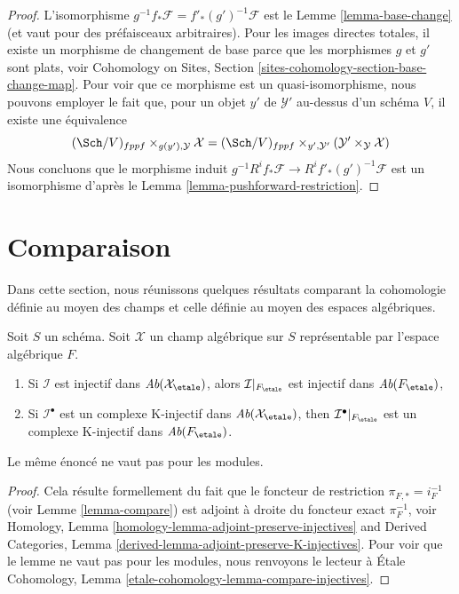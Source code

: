 \begin{proof}
L'isomorphisme $g^{-1}f_*\mathcal{F} = f'_*(g')^{-1}\mathcal{F}$ est le
Lemme \ref{lemma-base-change} (et vaut pour des préfaisceaux arbitraires).
Pour les images directes totales, il existe un morphisme de changement de base parce que les
morphismes $g$ et $g'$ sont plats, voir
Cohomology on Sites, Section \ref{sites-cohomology-section-base-change-map}.
Pour voir que ce morphisme est un quasi-isomorphisme, nous pouvons employer le fait que, pour
un objet $y'$ de $\mathcal{Y}'$ au-dessus d'un schéma $V$, il existe une équivalence
$$
(\Sch/V)_{fppf} \times_{g(y'), \mathcal{Y}} \mathcal{X}
=
(\Sch/V)_{fppf} \times_{y', \mathcal{Y}'}
(\mathcal{Y}' \times_\mathcal{Y} \mathcal{X})
$$
Nous concluons que le morphisme induit
$g^{-1}R^if_*\mathcal{F} \to R^if'_*(g')^{-1}\mathcal{F}$
est un isomorphisme d'après le
Lemma \ref{lemma-pushforward-restriction}.
\end{proof}












\section{Comparaison}
\label{section-compare}

\noindent
Dans cette section, nous réunissons quelques résultats comparant la cohomologie définie
au moyen des champs et celle définie au moyen des espaces algébriques.

\begin{lemma}
\label{lemma-compare-injectives}
Soit $S$ un schéma. Soit $\mathcal{X}$ un champ algébrique sur $S$
représentable par l'espace algébrique $F$.
\begin{enumerate}
\item Si $\mathcal{I}$ est injectif dans $\textit{Ab}(\mathcal{X}_\etale)$, alors
$\mathcal{I}|_{F_\etale}$ est injectif dans $\textit{Ab}(F_\etale)$,
\item Si $\mathcal{I}^\bullet$ est un complexe K-injectif dans
$\textit{Ab}(\mathcal{X}_\etale)$, then $\mathcal{I}^\bullet|_{F_\etale}$
est un complexe K-injectif dans $\textit{Ab}(F_\etale)$.
\end{enumerate}
Le même énoncé ne vaut pas pour les modules.
\end{lemma}

\begin{proof}
Cela résulte formellement du fait que le foncteur de restriction
$\pi_{F, *} = i_F^{-1}$ (voir Lemme \ref{lemma-compare})
est adjoint à droite du foncteur exact $\pi_F^{-1}$, voir
Homology, Lemma \ref{homology-lemma-adjoint-preserve-injectives} and
Derived Categories, Lemma \ref{derived-lemma-adjoint-preserve-K-injectives}.
Pour voir que le lemme ne vaut pas pour les modules, nous renvoyons le
lecteur à Étale Cohomology, Lemma
\ref{etale-cohomology-lemma-compare-injectives}.
\end{proof}

